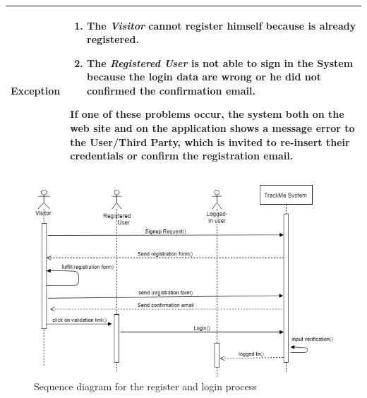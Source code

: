 \begin{table}[H]
\begin{tabular}{|p{3.5cm}|p{10.3cm}|}
    \hline
    \textbf{\large{Exception}} 			& \begin{enumerate}[leftmargin=0.5cm]
                                          	\item The \emph{Visitor} cannot register himself because is already registered.
                                          	\item The \emph{Registered User} is not able to sign in the System because the login data are wrong or he did not confirmed the confirmation email.
                                            \end{enumerate}
    										If one of these problems occur, the system both on the web site and on the application shows a message error to the User/Third Party, which is invited to re-insert their credentials or confirm the registration email.\\
    
    \hline
    
    \end{tabular}
	
\end{table}
\begin{figure}[H]

    \centering
    \includegraphics[scale=0.4]{rasdL/Pictures/login1.png}
    \caption{Sequence diagram for the register and login process}
    
\end{figure}

